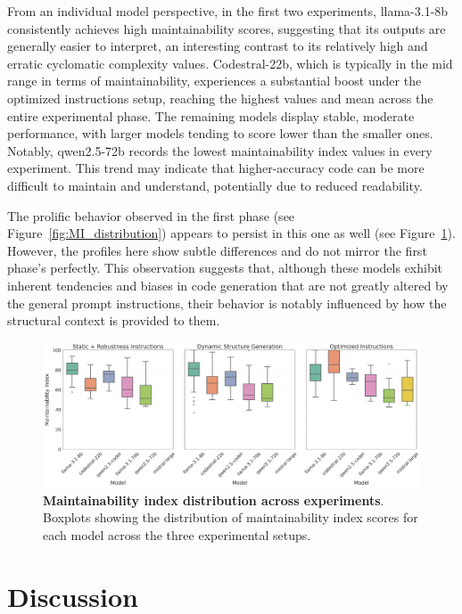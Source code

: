 \documentclass{DESSThesis}
\begin{document}
\noindent From an individual model perspective, in the first two experiments, llama-3.1-8b consistently achieves high maintainability scores, suggesting that its outputs are generally easier to interpret, an interesting contrast to its relatively high and erratic cyclomatic complexity values. Codestral-22b, which is typically in the mid range in terms of maintainability, experiences a substantial boost under the optimized instructions setup, reaching the highest values and mean across the entire experimental phase. The remaining models display stable, moderate performance, with larger models tending to score lower than the smaller ones. Notably, qwen2.5-72b records the lowest maintainability index values in every experiment. This trend may indicate that higher-accuracy code can be more difficult to maintain and understand, potentially due to reduced readability.

The prolific behavior observed in the first phase (see Figure~\ref{fig:MI_distribution}) appears to persist in this one as well (see Figure~\ref{fig:MI_distribution_second}). However, the profiles here show subtle differences and do not mirror the first phase's perfectly. This observation suggests that, although these models exhibit inherent tendencies and biases in code generation that are not greatly altered by the general prompt instructions, their behavior is notably influenced by how the structural context is provided to them.

\begin{figure}[h]
    \centering
    \includegraphics[width=\linewidth]{img/Results/Second Experimental Phase/Maintainability Index per Model.png}
    \caption[Maintainability index distribution across experiments]{\textbf{Maintainability index distribution across experiments}. Boxplots showing the distribution of maintainability index scores for each model across the three experimental setups.}
    \label{fig:MI_distribution_second}
\end{figure}

\chapter{Discussion} \label{chap:discussion}
\end{document}
